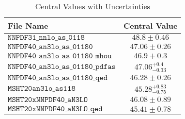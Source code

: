\begin{table}[h!]
\centering
\caption{Central Values with Uncertainties}
\label{tab:central_values}
\begin{tabular}{l c}
\hline
File Name & Central Value \\
\hline
$\mathtt{NNPDF31\_nnlo\_as\_0118}$ & $48.8 \pm 0.46$ \\
$\mathtt{NNPDF40\_an3lo\_as\_01180}$ & $47.06 \pm 0.26$ \\
$\mathtt{NNPDF40\_an3lo\_as\_01180\_mhou}$ & $46.9 \pm 0.3$ \\
$\mathtt{NNPDF40\_an3lo\_as\_01180\_pdfas}$ & $47.06 ^{{+0.4}}_{{-0.33}}$ \\
$\mathtt{NNPDF40\_an3lo\_as\_01180\_qed}$ & $46.28 \pm 0.26$ \\
$\mathtt{MSHT20an3lo\_as118}$ & $45.28 ^{{+0.83}}_{{-0.75}}$ \\
$\mathtt{MSHT20xNNPDF40\_aN3LO}$ & $46.08 \pm 0.89$ \\
$\mathtt{MSHT20xNNPDF40\_aN3LO\_qed}$ & $45.41 \pm 0.78$ \\
\hline
\end{tabular}
\end{table}
